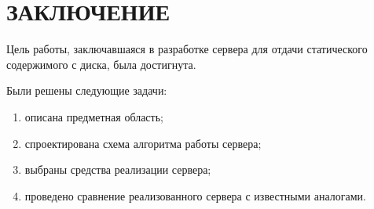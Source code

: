 \chapter*{ЗАКЛЮЧЕНИЕ}

Цель работы, заключавшаяся в разработке сервера для отдачи статического содержимого с диска, была достигнута.

Были решены следующие задачи:
\begin{enumerate}
	\item описана предметная область;
	\item спроектирована схема алгоритма работы сервера;
	\item выбраны средства реализации сервера;
	\item проведено сравнение реализованного сервера с известными аналогами.
\end{enumerate}